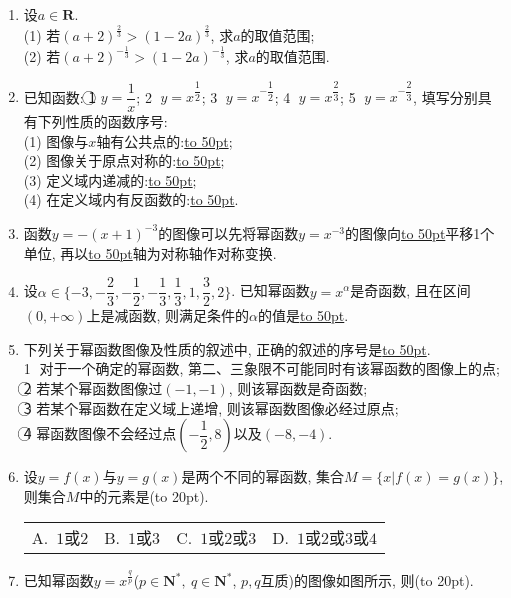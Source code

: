 \documentclass[10pt,a4paper]{article}
\newcommand{\blank}[1]{\underline{\hbox to #1pt{}}}
\newcommand{\bracket}[1]{(\hbox to #1pt{})}
\newcommand{\fourch}[4]{\par\begin{tabular}{p{.23\textwidth}p{.23\textwidth}p{.23\textwidth}p{.23\textwidth}}
A.~#1 &B.~#2& C.~#3& D.~#4
\end{tabular}}
\begin{document}
\begin{enumerate}[1.]
\item 设$a\in \mathbf{R}$.\\
(1) 若$(a+2)^{\frac 23}>{(1-2a)}^{\frac 23}$, 求$a$的取值范围;\\
(2) 若$(a+2)^{-\frac 13}>(1-2a)^{-\frac 13}$, 求$a$的取值范围.
\item 已知函数: \textcircled{1} $y=\dfrac 1x$; \textcircled{2} $y=x^{\dfrac 12}$; \textcircled{3} $y=x^{-\dfrac 12}$; \textcircled{4} $y={x^{\dfrac 23}}$; \textcircled{5} $y=x^{-\dfrac 23}$, 填写分别具有下列性质的函数序号:\\ 
(1) 图像与$x$轴有公共点的:\blank{50};\\
(2) 图像关于原点对称的:\blank{50};\\
(3) 定义域内递减的:\blank{50};\\
(4) 在定义域内有反函数的:\blank{50}.
\item 函数$y=-(x+1)^{-3}$的图像可以先将幂函数$y=x^{-3}$的图像向\blank{50}平移1个单位, 再以\blank{50}轴为对称轴作对称变换.
\item 设$\alpha \in \{-3,-\dfrac 23,-\dfrac 12,-\dfrac 13,\dfrac 13,1,\dfrac 32,2\}$. 已知幂函数$y=x^{\alpha}$是奇函数, 且在区间$(0,+\infty)$上是减函数, 则满足条件的$\alpha$的值是\blank{50}.
\item 下列关于幂函数图像及性质的叙述中, 正确的叙述的序号是\blank{50}.\\
\textcircled{1} 对于一个确定的幂函数, 第二、三象限不可能同时有该幂函数的图像上的点;\\
\textcircled{2} 若某个幂函数图像过$(-1,-1)$, 则该幂函数是奇函数;\\
\textcircled{3} 若某个幂函数在定义域上递增, 则该幂函数图像必经过原点;\\
\textcircled{4} 幂函数图像不会经过点$(-\dfrac 12,8)$以及$(-8,-4)$.
\item 设$y=f(x)$与$y=g(x)$是两个不同的幂函数, 集合$M=\{x|f(x)=g(x)  \}$, 则集合$M$中的元素是\bracket{20}.
\fourch{$1$或$2$}{$1$或$3$}{$1$或$2$或$3$}{$1$或$2$或$3$或$4$}
\item 已知幂函数$y=x^{\frac qp}$($p\in \mathbf{N}^*,\ q\in \mathbf{N}^*$, $p,q$互质)的图像如图所示, 则\bracket{20}.
\begin{center}
\end{center}
\end{enumerate}
\end{document}
